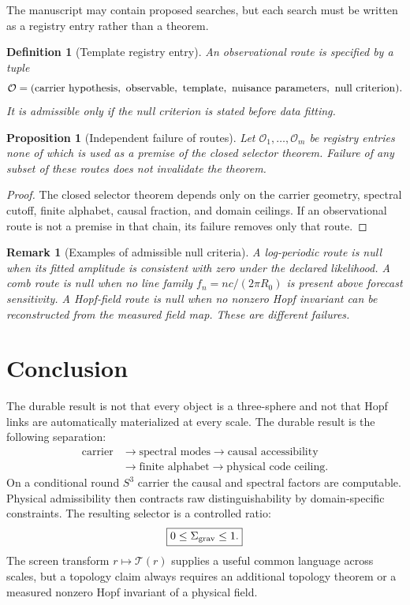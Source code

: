 \documentclass[11pt,a4paper]{article}
\newtheorem{proposition}[theorem]{Proposition}
\newtheorem{definition}[theorem]{Definition}
\newtheorem{remark}[theorem]{Remark}
\begin{document}
The manuscript may contain proposed searches, but each search must be written as a registry entry rather than a theorem.

\begin{definition}[Template registry entry]
An observational route is specified by a tuple
\[
\mathcal O=
({\rm carrier\ hypothesis},\ {\rm observable},\ {\rm template},\ {\rm nuisance\ parameters},\ {\rm null\ criterion}).
\]
It is admissible only if the null criterion is stated before data fitting.
\end{definition}

\begin{proposition}[Independent failure of routes]
Let $\mathcal O_1,\dots,\mathcal O_m$ be registry entries none of which is used as a premise of the closed selector theorem.  Failure of any subset of these routes does not invalidate the theorem.
\end{proposition}
\begin{proof}
The closed selector theorem depends only on the carrier geometry, spectral cutoff, finite alphabet, causal fraction, and domain ceilings.  If an observational route is not a premise in that chain, its failure removes only that route.
\end{proof}

\begin{remark}[Examples of admissible null criteria]
A log-periodic route is null when its fitted amplitude is consistent with zero under the declared likelihood.  A comb route is null when no line family $f_n=nc/(2\pi R_0)$ is present above forecast sensitivity.  A Hopf-field route is null when no nonzero Hopf invariant can be reconstructed from the measured field map.  These are different failures.
\end{remark}


\section{Conclusion}

The durable result is not that every object is a three-sphere and not that Hopf links are automatically materialized at every scale.  The durable result is the following separation:
\[
\begin{aligned}
\text{carrier}
&\to \text{spectral modes}
 \to \text{causal accessibility}\\
&\to \text{finite alphabet}
 \to \text{physical code ceiling}.
\end{aligned}
\]
On a conditional round $S^3$ carrier the causal and spectral factors are computable.  Physical admissibility then contracts raw distinguishability by domain-specific constraints.  The resulting selector is a controlled ratio:
\[
\boxed{
0\le\Sigma_{\rm grav}\le1.
}
\]
The screen transform $r\mapsto\mathcal T(r)$ supplies a useful common language across scales, but a topology claim always requires an additional topology theorem or a measured nonzero Hopf invariant of a physical field.
\end{document}
